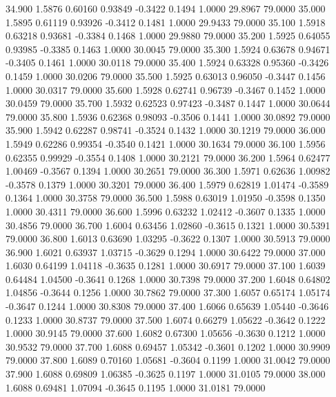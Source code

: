   34.900   1.5876   0.60160   0.93849  -0.3422   0.1494   1.0000  29.8967  79.0000
  35.000   1.5895   0.61119   0.93926  -0.3412   0.1481   1.0000  29.9433  79.0000
  35.100   1.5918   0.63218   0.93681  -0.3384   0.1468   1.0000  29.9880  79.0000
  35.200   1.5925   0.64055   0.93985  -0.3385   0.1463   1.0000  30.0045  79.0000
  35.300   1.5924   0.63678   0.94671  -0.3405   0.1461   1.0000  30.0118  79.0000
  35.400   1.5924   0.63328   0.95360  -0.3426   0.1459   1.0000  30.0206  79.0000
  35.500   1.5925   0.63013   0.96050  -0.3447   0.1456   1.0000  30.0317  79.0000
  35.600   1.5928   0.62741   0.96739  -0.3467   0.1452   1.0000  30.0459  79.0000
  35.700   1.5932   0.62523   0.97423  -0.3487   0.1447   1.0000  30.0644  79.0000
  35.800   1.5936   0.62368   0.98093  -0.3506   0.1441   1.0000  30.0892  79.0000
  35.900   1.5942   0.62287   0.98741  -0.3524   0.1432   1.0000  30.1219  79.0000
  36.000   1.5949   0.62286   0.99354  -0.3540   0.1421   1.0000  30.1634  79.0000
  36.100   1.5956   0.62355   0.99929  -0.3554   0.1408   1.0000  30.2121  79.0000
  36.200   1.5964   0.62477   1.00469  -0.3567   0.1394   1.0000  30.2651  79.0000
  36.300   1.5971   0.62636   1.00982  -0.3578   0.1379   1.0000  30.3201  79.0000
  36.400   1.5979   0.62819   1.01474  -0.3589   0.1364   1.0000  30.3758  79.0000
  36.500   1.5988   0.63019   1.01950  -0.3598   0.1350   1.0000  30.4311  79.0000
  36.600   1.5996   0.63232   1.02412  -0.3607   0.1335   1.0000  30.4856  79.0000
  36.700   1.6004   0.63456   1.02860  -0.3615   0.1321   1.0000  30.5391  79.0000
  36.800   1.6013   0.63690   1.03295  -0.3622   0.1307   1.0000  30.5913  79.0000
  36.900   1.6021   0.63937   1.03715  -0.3629   0.1294   1.0000  30.6422  79.0000
  37.000   1.6030   0.64199   1.04118  -0.3635   0.1281   1.0000  30.6917  79.0000
  37.100   1.6039   0.64484   1.04500  -0.3641   0.1268   1.0000  30.7398  79.0000
  37.200   1.6048   0.64802   1.04856  -0.3644   0.1256   1.0000  30.7862  79.0000
  37.300   1.6057   0.65174   1.05174  -0.3647   0.1244   1.0000  30.8308  79.0000
  37.400   1.6066   0.65639   1.05440  -0.3646   0.1233   1.0000  30.8737  79.0000
  37.500   1.6074   0.66279   1.05622  -0.3642   0.1222   1.0000  30.9145  79.0000
  37.600   1.6082   0.67300   1.05656  -0.3630   0.1212   1.0000  30.9532  79.0000
  37.700   1.6088   0.69457   1.05342  -0.3601   0.1202   1.0000  30.9909  79.0000
  37.800   1.6089   0.70160   1.05681  -0.3604   0.1199   1.0000  31.0042  79.0000
  37.900   1.6088   0.69809   1.06385  -0.3625   0.1197   1.0000  31.0105  79.0000
  38.000   1.6088   0.69481   1.07094  -0.3645   0.1195   1.0000  31.0181  79.0000
